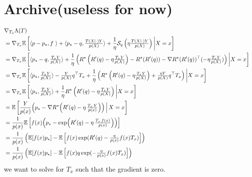 \documentclass{article}
\theoremstyle{plain}
\theoremstyle{definition}
\theoremstyle{remark}
\newcommand{\E}{\mathbb E}
\newcommand{\cS}{\mathcal S}
\theoremstyle{definition}
\begin{document}
\clearpage
\section{Archive(useless for now)}
\begin{align*}
     & \nabla_{T_x}
    \Lambda(T)      \\
     & =
    \nabla_{T_x}
    \E\left[
        \langle p - p_\star, f \
        \rangle
        + \langle p_\star - q, \tfrac{T(X|\cdot) Y}{p(X)} \rangle
        + \frac{1}{\eta} \cS_q\left(\eta \tfrac{T(X|\cdot) Y}{p(X)}\right)
        \bigg| X = x
        \right]
    \\
     & =
    \nabla_{T_x}
    \E\left[
        \langle p_\star - q, \tfrac{T_x Y}{p(X)} \rangle
        + \frac{1}{\eta} \left(
        R^\star\left(R'(q) - \eta \tfrac{T_x Y}{p(X)}\right)
        - R^\star(R'(q))
        - \nabla R^\star(R'(q))^\top (- \eta \tfrac{T_x Y}{p(X)})
        \right)
        \bigg| X = x
        \right]
    \\
     & =
    \nabla_{T_x}
    \E\left[
        \langle p_\star, \tfrac{T_x Y}{p(X)} \rangle
        -
        \tfrac{Y}{p(X)} q^\top T_x
        + \frac{1}{\eta} \left(
        R^\star\left(R'(q) - \eta \tfrac{T_x Y}{p(X)}\right)
        + \tfrac{\eta Y}{p(X)} q^\top T_x
        \right)
        \bigg| X = x
        \right]
    \\
     & =
    \nabla_{T_x}
    \E\left[
        \langle p_\star, \tfrac{T_x Y}{p(X)} \rangle
        + \frac{1}{\eta}
        R^\star\left(R'(q) - \eta \tfrac{T_x Y}{p(X)}\right)
        \bigg| X = x
        \right]
    \\
     & =
    \E\left[
        \frac{Y}{p(x)}
        \Bigl(
        p_\star - \nabla R^\star\Bigl(R'(q)-\eta\,\tfrac{T_x\,Y}{p(x)}\Bigr)
        \Bigr)
        \,\Big|\, X = x
        \right]
    \\
     & =
    \frac{1}{p(x)}
    \E\left[
        f(x) \Bigl(
        p_\star - \exp\Bigl(R'(q)-\eta\,\tfrac{T_x\,f(x)}{p(x)}\Bigr)
        \Bigr)
        \right]
    \\
     & =
    \frac{1}{p(x)}
    \left(
    \E[f(x) p_\star] -
    \E\left[
            f(x)
            \exp(R'(q)- \tfrac{\eta}{p(x)} f(x) T_x)
            \right]
    \right)
    \\
     & =
    \frac{1}{p(x)}
    \left(
    \E[f(x) p_\star] -
    \E\left[
            f(x)q
            \exp(- \tfrac{\eta}{p(x)} f(x) T_x)
            \right]
    \right)
\end{align*}
we want to solve for $T_x$ such that the gradient is zero.
\end{document}
